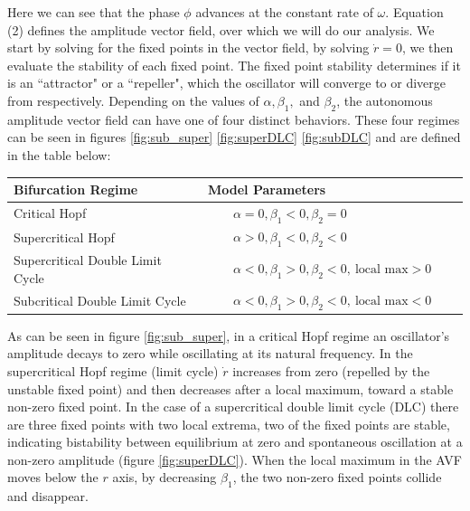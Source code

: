 \documentclass{article}
\begin{document}
Here we can see that the phase $\phi$ advances at the constant rate of $\omega$.
Equation (2) defines the amplitude vector field, over which we will do our analysis. We start by solving for the fixed points in the vector field, by solving $\dot{r} = 0$, we then evaluate the stability of each fixed point.  The fixed point stability determines if it is an ``attractor" or a ``repeller", which the oscillator will converge to or diverge from respectively. Depending on the values of $\alpha, \beta_1,$ and $\beta_2$, the autonomous amplitude vector field can have one of four distinct behaviors. These four regimes can be seen in figures \ref{fig:sub_super} \ref{fig:superDLC} \ref{fig:subDLC} and are defined in the table below:

\begin{table}[ht]
  \centering
    \begin{tabular}{ | l | l | }
      \hline
      Bifurcation Regime & Model Parameters  \\
      \hline
      Critical Hopf     & $\qquad \alpha = 0, \beta_1 <0,\beta_2 = 0 \qquad$ \\
       \hline
      Supercritical Hopf     & $\qquad \alpha > 0, \beta_1 < 0,\beta_2 < 0 \qquad$    \\
       \hline
      Supercritical Double Limit Cycle   & $\qquad \alpha < 0, \beta_1 > 0,\beta_2 < 0, ~\text{local max} > 0 \qquad$ \\   
       \hline
      Subcritical Double Limit Cycle     & $\qquad \alpha < 0, \beta_1 > 0,\beta_2 < 0, ~\text{local max} < 0 \qquad$ \\    
      \hline
    \end{tabular}
  \label{table:regimes}
\end{table}

As can be seen in figure \ref{fig:sub_super}, in a critical Hopf regime an oscillator's amplitude decays to zero while oscillating at its natural frequency.  In the supercritical Hopf regime (limit cycle) $\dot{r}$  increases from zero (repelled by the unstable fixed point) and then decreases after a local maximum, toward a stable non-zero fixed point. In the case of a supercritical double limit cycle (DLC) there are three fixed points with two local extrema, two of the fixed points are stable, indicating bistability between equilibrium at zero and spontaneous oscillation at a non-zero amplitude (figure \ref{fig:superDLC}). When the local maximum in the AVF moves below the $r$ axis, by decreasing $\beta_1$, the two non-zero fixed points collide and disappear.
\end{document}
